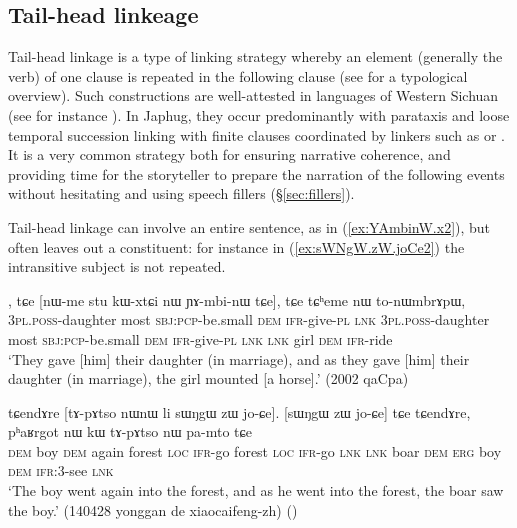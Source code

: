 \subsection{Tail-head linkeage} \label{sec:tail.head.linkeage}
Tail-head linkage is a type of linking strategy whereby an element (generally the verb) of one clause  is repeated in the following clause (see \citealt{vries05tailhead} for a typological overview). Such constructions are well-attested in languages of Western Sichuan (see for instance \citealt[688--693]{zhangsh13ersu}). In Japhug, they occur predominantly with parataxis and loose temporal succession linking with finite clauses coordinated by linkers such as  or . It is a very common strategy both for ensuring narrative coherence, and providing time for the storyteller to prepare the narration of the following events without hesitating and using speech fillers (§\ref{sec:fillers}). 

Tail-head linkage can involve an entire sentence, as  in (\ref{ex:YAmbinW.x2}), but often leaves out a constituent: for instance in (\ref{ex:sWNgW.zW.joCe2}) the intransitive subject  is not repeated.

\begin{exe}
\ex \label{ex:YAmbinW.x2}
, tɕe [nɯ-me stu kɯ-xtɕi nɯ ɲɤ-mbi-nɯ tɕe], tɕe tɕʰeme nɯ to-nɯmbrɤpɯ, \\
\textsc{3pl}.\textsc{poss}-daughter most \textsc{sbj}:\textsc{pcp}-be.small \textsc{dem} \textsc{ifr}-give-\textsc{pl}  \textsc{lnk} \textsc{3pl}.\textsc{poss}-daughter most \textsc{sbj}:\textsc{pcp}-be.small \textsc{dem} \textsc{ifr}-give-\textsc{pl}  \textsc{lnk}  \textsc{lnk} girl \textsc{dem} \textsc{ifr}-ride \\
\glt `They gave [him] their daughter (in marriage), and as they gave [him] their daughter (in marriage),  the girl mounted [a horse].' (2002 qaCpa)
\end{exe}


\begin{exe}
\ex \label{ex:sWNgW.zW.joCe2}
\gll tɕendɤre [tɤ-pɤtso nɯnɯ li sɯŋgɯ zɯ jo-ɕe]. [sɯŋgɯ zɯ jo-ɕe] tɕe tɕendɤre, pʰaʁrgot nɯ kɯ tɤ-pɤtso nɯ pa-mto tɕe \\
  \textsc{dem} boy \textsc{dem} again forest \textsc{loc} \textsc{ifr}-go  forest \textsc{loc} \textsc{ifr}-go \textsc{lnk} \textsc{lnk} boar \textsc{dem} \textsc{erg} boy \textsc{dem} \textsc{ifr}:3\flobv{}-see \textsc{lnk}   \\
\glt `The boy went again into the forest, and as he went into the forest, the boar saw the boy.' (140428 yonggan de xiaocaifeng-zh)
()
\end{exe}

